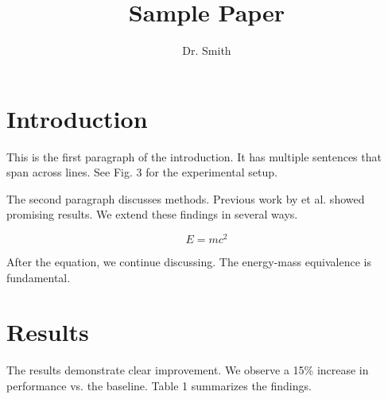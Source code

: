 \documentclass{article}
\title{Sample Paper}
\author{Dr. Smith}
\begin{document}
\maketitle

\section{Introduction}

This is the first paragraph of the introduction. It has multiple sentences that span across lines. See Fig. 3 for the experimental setup.

The second paragraph discusses methods. Previous work by et al. showed promising results. We extend these findings in several ways.

\begin{equation}
E = mc^2
\end{equation}

After the equation, we continue discussing. The energy-mass equivalence is fundamental.

\section{Results}

The results demonstrate clear improvement. We observe a 15\% increase in performance vs. the baseline. Table 1 summarizes the findings.
\end{document}

